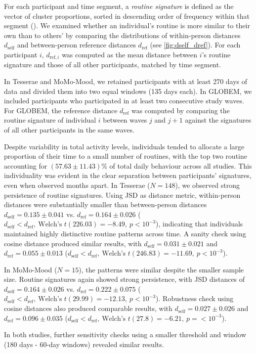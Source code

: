 \documentclass[pdflatex,sn-vancouver,Numbered]{bst/sn-jnl}%
\theoremstyle{thmstyleone}%
\theoremstyle{thmstyletwo}%
\theoremstyle{thmstylethree}%
\newcommand{\dself}[2]{$d_{\text{self}} = #1 \pm #2$}
\newcommand{\dref}[2]{$d_{\text{ref}} = #1 \pm #2$}
\newcommand{\dselfdrefp}[3]{$d_{\text{self}} < d_{\text{ref}},\ \text{Welch's } t(#1) = #2,\ p = #3$}
\newcommand{\dselfdrefpl}[3]{$d_{\text{self}} < d_{\text{ref}},\ \text{Welch's } t(#1) = #2,\ p < #3$}
\begin{document}
For each participant and time segment, a \textit{routine signature} is defined as the vector of cluster proportions, sorted in descending order of frequency within that segment (). We examined whether an individual’s routine is more similar to their own than to others’ by comparing the distributions of within-person distances \(d_{\text{self}}\) and between-person reference distances \(d_{\text{ref}}\) (see \autoref{fig:dself_dref}). For each participant \(i\), \(d_{\text{ref},i}\) was computed as the mean distance between \(i\)’s routine signature and those of all other participants, matched by time segment.

In Tesserae and MoMo-Mood, we retained participants with at least 270 days of data and divided them into two equal windows (135 days each). In GLOBEM, we included participants who participated in at least two consecutive study waves. For GLOBEM, the reference distance \(d_{\text{ref}}\) was computed by comparing the routine signature of individual \(i\) between waves \(j\) and \(j+1\) against the signatures of all other participants in the same waves.

Despite variability in total activity levels, individuals tended to allocate a large proportion of their time to a small number of routines, with the top two routine accounting for $(57.63 \pm 11.43)\%$ of total daily behaviour across all studies. This individuality was evident in the clear separation between participants’ signatures, even when observed months apart. In Tesserae (\(N=148\)), we observed strong persistence of routine signatures. Using JSD as distance metric, within-person distances were substantially smaller than between-person distances \dself{0.135}{0.041} vs. \dref{0.164}{0.026} (\dselfdrefpl{226.03}{-8.49}{10^{-3}}), indicating that individuals maintained highly distinctive routine patterns across time. A sanity check using cosine distance produced similar results, with \dself{0.031}{0.021} and \dref{0.055}{0.013} (\dselfdrefpl{246.83}{-11.69}{10^{-3}}). 

In MoMo-Mood (\(N=15\)), the patterns were similar despite the smaller sample size. Routine signatures again showed strong persistence, with JSD distances of \dself{0.164}{0.026} vs. \dref{0.222}{0.075} (\dselfdrefpl{29.99}{-12.13}{10^{-3}}). Robustness check using cosine distances also produced comparable results, with \dself{0.027}{0.026} and \dref{0.096}{0.035} (\dselfdrefp{27.8}{-6.21}{< 10^{-3}}).

In both studies, further sensitivity checks using a smaller threshold and window (180 days - 60-day windows) revealed similar results. 
\end{document}
